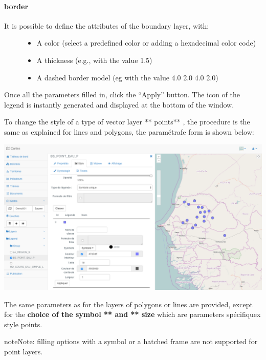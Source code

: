 \documentclass[letterpaper,10pt,english]{sphinxmanual}
\begin{document}
\paragraph{border}
\begin{description}
\item[{It is possible to define the attributes of the boundary layer, with:}] \leavevmode\begin{itemize}
\item {} 
A color (select a predefined color or adding a hexadecimal color code)

\item {} 
A thickness (e.g., with the value 1.5)

\item {} 
A dashed border model (eg with the value 4.0 2.0 4.0 2.0)

\end{itemize}

\end{description}

Once all the parameters filled in, click the ``Apply'' button. The icon of the legend is instantly generated and displayed at the bottom of the window.

To change the style of a type of vector layer ** points** , the procedure is the same as explained for lines and polygons, the paramétrafe form is shown below:

\includegraphics[width=1.000\linewidth]{set-symbol-window.png}

The same parameters as for the layers of polygons or lines are provided, except for the  \textbf{choice of the symbol ** and ** size}  which are parameters spécifiquex style points.

\begin{notice}{note}{Note:}
filling options with a symbol or a hatched frame are not supported for point layers.
\end{notice}
\end{document}
